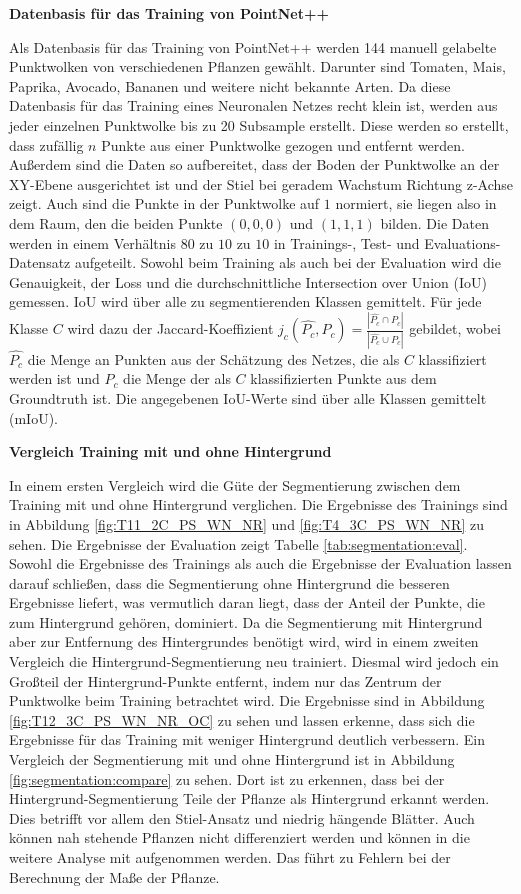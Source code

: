\documentclass[12pt,titlepage, twoside]{article}
\begin{document}
\textbf{Datenbasis für das Training von PointNet++}

Als Datenbasis für das Training von PointNet++ werden 144 manuell gelabelte Punktwolken von verschiedenen Pflanzen gewählt. Darunter sind Tomaten, Mais, Paprika, Avocado, Bananen und weitere nicht bekannte Arten. 
Da diese Datenbasis für das Training eines Neuronalen Netzes recht klein ist, werden aus jeder einzelnen Punktwolke bis zu 20 Subsample erstellt. 
Diese werden so erstellt, dass zufällig $n$ Punkte aus einer Punktwolke gezogen und entfernt werden.
Außerdem sind die Daten so aufbereitet, dass der Boden der Punktwolke an der XY-Ebene ausgerichtet ist und der Stiel bei geradem Wachstum Richtung z-Achse zeigt. 
Auch sind die Punkte in der Punktwolke auf $1$ normiert, sie liegen also in dem Raum, den die beiden Punkte $(0,0,0)$ und $(1,1,1)$ bilden. 
Die Daten werden in einem Verhältnis $80$ zu $10$ zu $10$ in Trainings-, Test- und Evaluations-Datensatz aufgeteilt.
Sowohl beim Training als auch bei der Evaluation wird die Genauigkeit, der Loss und die durchschnittliche Intersection over Union (IoU) gemessen. IoU wird über alle zu segmentierenden Klassen gemittelt.
Für jede Klasse $C$ wird dazu der Jaccard-Koeffizient $j_c(\hat{P_c},P_c) = \frac{|\hat{P_c} \cap P_c|}{|\hat{P_c} \cup P_c|}$ gebildet, wobei $\hat{P_c}$ die Menge an Punkten aus der Schätzung des Netzes, die als $C$ klassifiziert werden ist und $P_c$ die Menge der als $C$ klassifizierten Punkte aus dem Groundtruth ist.
Die angegebenen IoU-Werte sind über alle Klassen gemittelt (mIoU).

\textbf{Vergleich Training mit und ohne Hintergrund}

In einem ersten Vergleich wird die Güte der Segmentierung zwischen dem Training mit und ohne Hintergrund verglichen. 
Die Ergebnisse des Trainings sind in Abbildung \ref{fig:T11_2C_PS_WN_NR} und \ref{fig:T4_3C_PS_WN_NR} zu sehen.
Die Ergebnisse der Evaluation zeigt Tabelle \ref{tab:segmentation:eval}. 
Sowohl die Ergebnisse des Trainings als auch die Ergebnisse der Evaluation lassen darauf schließen, dass die Segmentierung ohne Hintergrund die besseren Ergebnisse liefert, 
was vermutlich daran liegt, dass der Anteil der Punkte, die zum Hintergrund gehören, dominiert.
Da die Segmentierung mit Hintergrund aber zur Entfernung des Hintergrundes benötigt wird, wird in einem zweiten Vergleich die Hintergrund-Segmentierung neu trainiert. 
Diesmal wird jedoch ein Großteil der Hintergrund-Punkte entfernt, indem nur das Zentrum der Punktwolke beim Training betrachtet wird. 
Die Ergebnisse sind in Abbildung \ref{fig:T12_3C_PS_WN_NR_OC} zu sehen und lassen erkenne, dass sich die Ergebnisse für das Training mit weniger Hintergrund deutlich verbessern. 
Ein Vergleich der Segmentierung mit und ohne Hintergrund ist in Abbildung \ref{fig:segmentation:compare} zu sehen. 
Dort ist zu erkennen, dass bei der Hintergrund-Segmentierung Teile der Pflanze als Hintergrund erkannt werden. Dies betrifft vor allem den Stiel-Ansatz und niedrig hängende Blätter.
Auch können nah stehende Pflanzen nicht differenziert werden und können in die weitere Analyse mit aufgenommen werden. Das führt zu Fehlern bei der Berechnung der Maße der Pflanze.
\end{document}
